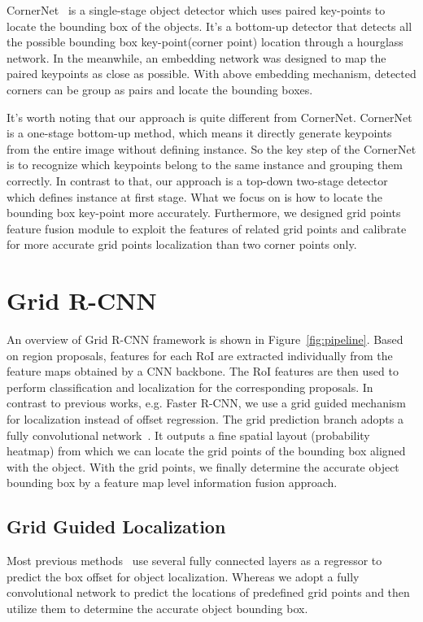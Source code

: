 \documentclass[10pt,twocolumn,letterpaper]{article}
\begin{document}
CornerNet~\cite{law2018cornernet} is a single-stage object detector which uses paired key-points to locate the bounding box of the objects. It's a bottom-up detector that detects all the possible bounding box key-point(corner point) location through a hourglass~\cite{newell2016stacked} network. In the meanwhile, an embedding network was designed to map the paired keypoints as close as possible. With above embedding mechanism, detected corners can be group as pairs and locate the bounding boxes.

It's worth noting that our approach is quite different from CornerNet. CornerNet is a one-stage bottom-up method, which means it directly generate keypoints from the entire image without defining instance. So the key step of the CornerNet is to recognize which keypoints belong to the same instance and grouping them correctly. In contrast to that, our approach is a top-down two-stage detector which defines instance at first stage. What we focus on is how to locate the bounding box key-point more accurately. Furthermore, we designed grid points feature fusion module to exploit the features of related grid points and calibrate for more accurate grid points localization than two corner points only.


\section{Grid R-CNN}
An overview of Grid R-CNN framework is shown in Figure~\ref{fig:pipeline}. Based on region proposals, features for each RoI are extracted individually from the feature maps obtained by a CNN backbone. The RoI features are then used to perform classification and localization for the corresponding proposals. In contrast to previous works, e.g. Faster R-CNN, we use a grid guided mechanism for localization instead of offset regression. The grid prediction branch adopts a fully convolutional network~\cite{long2015fully}. It outputs a fine spatial layout (probability heatmap) from which we can locate the grid points of the bounding box aligned with the object. With the grid points, we finally determine the accurate object bounding box by a feature map level information fusion approach.



\subsection{Grid Guided Localization}
\label{sec:gl}
Most previous methods~\cite{girshick2014rich,girshick2015fast,ren2015faster,lin2017feature,he2017mask,cai2017cascade} use several fully connected layers as a regressor to predict the box offset for object localization. Whereas we adopt a fully convolutional network to predict the locations of predefined grid points and then utilize them to determine the accurate object bounding box.
\end{document}
